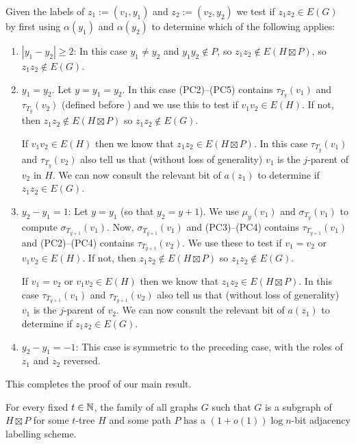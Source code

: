 \documentclass[kpfonts]{patmorin}
\let\ge\geqslant
\begin{document}
Given the labels of $z_1:=(v_1,y_1)$ and $z_2:=(v_2,y_2)$ we test if $z_1z_2\in E(G)$ by first using $\alpha(y_1)$ and $\alpha(y_2)$ to determine which of the following applies:
\begin{enumerate}
  \item $|y_1-y_2|\ge 2$: In this case $y_1\neq y_2$ and $y_1y_2\not\in P$, so $z_1z_2\not\in E(H\boxtimes P)$, so $z_1z_2\not\in E(G)$.

  \item $y_1=y_2$.  Let $y=y_1=y_2$.  In this case (PC2)--(PC5) contains $\tau_{T_y}(v_1)$ and $\tau_{T_y}(v_2)$ (defined before ) and we use this to test if $v_1v_2\in E(H)$.  If not, then $z_1z_2\not\in E(H\boxtimes P)$ so $z_1z_2\not\in E(G)$.

  If $v_1v_2\in E(H)$ then we know that $z_1z_2\in E(H\boxtimes P)$.  In this case $\tau_{T_y}(v_1)$ and $\tau_{T_y}(v_2)$ also tell us that (without loss of generality) $v_1$ is the $j$-parent of $v_2$ in $H$.  We can now consult the relevant bit of $a(z_1)$ to determine if $z_1z_2\in E(G)$.

  \item $y_2-y_1=1$: Let $y=y_1$ (so that $y_2=y+1$).  We use $\mu_y(v_1)$ and $\sigma_{T_y}(v_1)$ to compute $\sigma_{T_{y+1}}(v_1)$.  Now, $\sigma_{T_{y+1}}(v_1)$ and (PC3)--(PC4) contains $\tau_{T_{y+1}}(v_1)$ and (PC2)--(PC4) contains $\tau_{T_{y+1}}(v_2)$.  We use these to test if $v_1=v_2$ or $v_1v_2\in E(H)$.  If not, then $z_1z_2\not\in E(H\boxtimes P)$ so $z_1z_2\not\in E(G)$.

  If $v_1=v_2$ or $v_1v_2\in E(H)$ then we know that $z_1z_2\in E(H\boxtimes P)$.  In this case $\tau_{T_{y+1}}(v_1)$ and $\tau_{T_{y+1}}(v_2)$ also tell us that (without loss of generality) $v_1$ is the $j$-parent of $v_2$.  We can now consult the relevant bit of $a(z_1)$ to determine if $z_1z_2\in E(G)$.

  \item $y_2-y_1=-1$:  This case is symmetric to the preceding case, with the roles of $z_1$ and $z_2$ reversed.
\end{enumerate}

This completes the proof of our main result.

\begin{thm}
  For every fixed $t\in\mathbb{N}$, the family of all graphs $G$ such that $G$ is a subgraph of $H\boxtimes P$ for some $t$-tree $H$ and some path $P$ has a $(1+o(1))\log n$-bit adjacency labelling scheme.
\end{thm}
\end{document}
